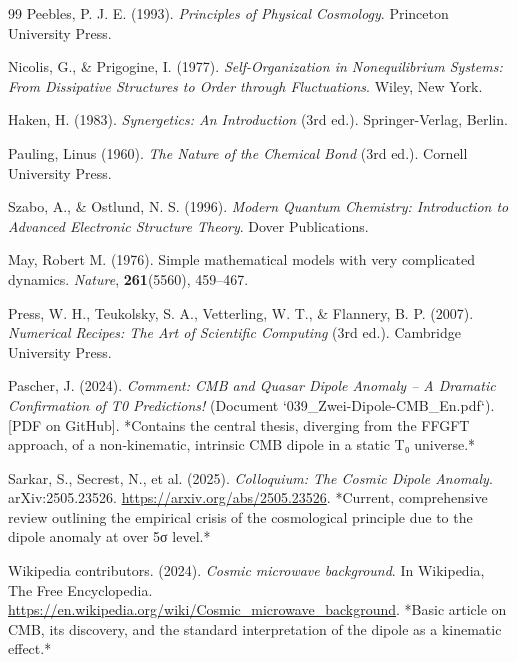 \begin{thebibliography}{99}
		Peebles, P. J. E. (1993). \textit{Principles of Physical Cosmology}. 
		Princeton University Press.
		
		Nicolis, G., \& Prigogine, I. (1977). \textit{Self-Organization in Nonequilibrium Systems: From Dissipative Structures to Order through Fluctuations}. 
		Wiley, New York.
		
		Haken, H. (1983). \textit{Synergetics: An Introduction} (3rd ed.). 
		Springer-Verlag, Berlin.
		
		Pauling, Linus (1960). \textit{The Nature of the Chemical Bond} (3rd ed.). 
		Cornell University Press.
		
		Szabo, A., \& Ostlund, N. S. (1996). \textit{Modern Quantum Chemistry: Introduction to Advanced Electronic Structure Theory}. 
		Dover Publications.
		
		May, Robert M. (1976). Simple mathematical models with very complicated dynamics. 
		\textit{Nature}, \textbf{261}(5560), 459--467.
		
		Press, W. H., Teukolsky, S. A., Vetterling, W. T., \& Flannery, B. P. (2007). \textit{Numerical Recipes: The Art of Scientific Computing} (3rd ed.). 
		Cambridge University Press.
		
		Pascher, J. (2024). \textit{Comment: CMB and Quasar Dipole Anomaly – A Dramatic Confirmation of T0 Predictions!} (Document `039\_Zwei-Dipole-CMB\_En.pdf`).
		[PDF on GitHub].
		*Contains the central thesis, diverging from the FFGFT approach, of a non-kinematic, intrinsic CMB dipole in a static T₀ universe.*
		
		Sarkar, S., Secrest, N., et al. (2025). \textit{Colloquium: The Cosmic Dipole Anomaly}. 
		arXiv:2505.23526.
		\href{https://arxiv.org/abs/2505.23526}{https://arxiv.org/abs/2505.23526}.
		*Current, comprehensive review outlining the empirical crisis of the cosmological principle due to the dipole anomaly at over 5σ level.*
		
		Wikipedia contributors. (2024). \textit{Cosmic microwave background}. 
		In Wikipedia, The Free Encyclopedia.
		\href{https://en.wikipedia.org/wiki/Cosmic_microwave_background}{https://en.wikipedia.org/wiki/Cosmic\_microwave\_background}.
		*Basic article on CMB, its discovery, and the standard interpretation of the dipole as a kinematic effect.*
		

\end{thebibliography}
